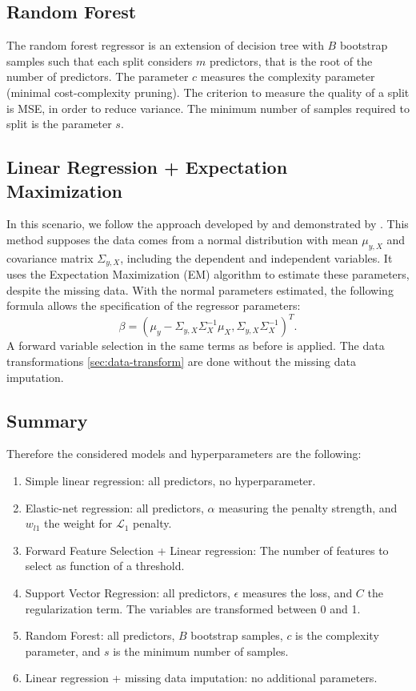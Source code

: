 \subsection{Random Forest}

The random forest regressor is an extension of decision tree with $B$
bootstrap samples such that each split considers $m$ predictors, that is the
root of the number of predictors. The parameter
$c$ measures the complexity parameter (minimal cost-complexity pruning).
The criterion to measure the quality of a split is MSE, in order to reduce
variance. The minimum number of samples required to split is the parameter
$s$. 


\subsection{Linear Regression + Expectation Maximization}

In this scenario, we follow the approach developed by \cite{rubin1977} and
demonstrated by \cite{missing-values-estimation}. This method supposes the
data comes from a normal distribution with mean $\mu_{y,X}$ and covariance matrix
$\Sigma_{y,X}$, including the dependent and independent variables. It uses the Expectation Maximization (EM) algorithm to estimate
these parameters, despite the missing data. With the normal parameters estimated, the following formula
allows the specification of the regressor parameters:
$$
\beta = (\mu_y - \Sigma_{y,X}\Sigma_X^{-1}\mu_X, \Sigma_{y,X}\Sigma_X^{-1})^T.
$$
A forward variable selection in the same terms as before is applied. The data
transformations \ref{sec:data-transform} are done without the missing data imputation.  

\subsection{Summary} 

Therefore the considered models and hyperparameters are the following:

\begin{enumerate}
    \item Simple linear regression: all predictors, no hyperparameter. 
    \item Elastic-net regression: all predictors, $\alpha$ measuring the
    penalty strength, and $w_{l1}$ the weight for $\mathcal{L}_1$ penalty. 
    \item Forward Feature Selection + Linear regression: The number of
    features to select as function of a threshold.
    \item Support Vector Regression: all predictors, $\epsilon$ measures the
    loss, and $C$ the regularization term. The variables are transformed
    between 0 and 1. 
    \item Random Forest: all predictors, $B$ bootstrap samples, $c$ is the
    complexity parameter, and $s$ is the minimum number of samples. 
    \item Linear regression + missing data imputation: no additional
    parameters. 
\end{enumerate}